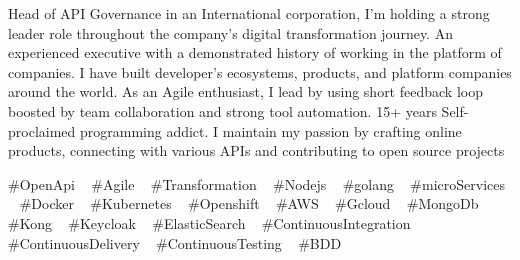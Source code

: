 

\begin{cvparagraph}


Head of API Governance in an International corporation, I'm holding a strong leader role throughout the company's digital transformation journey.
An experienced executive with a demonstrated history of working in the platform of companies. I have built developer's ecosystems, products, and platform companies around the world.
As an Agile enthusiast, I lead by using short feedback loop boosted by team collaboration and strong tool automation.
15+ years Self-proclaimed programming addict. I maintain my passion by crafting online products, connecting with various APIs and contributing to open source projects


\end{cvparagraph}
\begin{cvtechnologies}
 \#OpenApi ~
 \#Agile ~
 \#Transformation ~
 \#Nodejs ~
 \#golang ~
 \#microServices ~
 \#Docker ~
 \#Kubernetes ~
 \#Openshift ~
 \#AWS ~
 \#Gcloud ~
 \#MongoDb ~
 \#Kong ~
 \#Keycloak ~
 \#ElasticSearch ~
 \#ContinuousIntegration ~
 \#ContinuousDelivery ~
 \#ContinuousTesting ~
 \#BDD 
\end{cvtechnologies}
